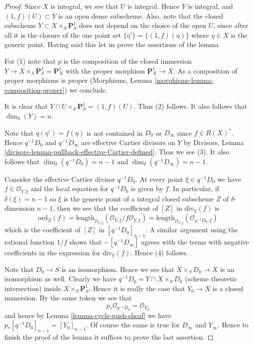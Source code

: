 \begin{proof}
Since $X$ is integral, we see that $U$ is integral.
Hence $Y$ is integral, and $(1, f)(U) \subset Y$ is an open dense subscheme.
Also, note that the closed subscheme $Y \subset X \times_S \mathbf{P}^1_S$
does not depend on the choice of the open $U$, since after all it is
the closure of the one point set $\{\eta'\} = \{(1, f)(\eta)\}$
where $\eta \in X$ is the generic point. Having said this let us
prove the assertions of the lemma.

\medskip\noindent
For (1) note that $p$ is the composition of the closed immersion
$Y \to X \times_S \mathbf{P}^1_S = \mathbf{P}^1_X$ with the proper
morphism $\mathbf{P}^1_X \to X$. As a composition of proper morphisms
is proper (Morphisms, Lemma \ref{morphisms-lemma-composition-proper})
we conclude.

\medskip\noindent
It is clear that $Y \cap U \times_S \mathbf{P}^1_S = (1, f)(U)$.
Thus (2) follows. It also follows that $\dim_\delta(Y) = n$.

\medskip\noindent
Note that $q(\eta') = f(\eta)$ is not contained in $D_0$ or $D_\infty$
since $f \in R(X)^*$. Hence $q^{-1}D_0$ and $q^{-1}D_\infty$ are
effective Cartier divisors on $Y$ by
Divisors, Lemma \ref{divisors-lemma-pullback-effective-Cartier-defined}.
Thus we see (3). It also follows that $\dim_\delta(q^{-1}D_0) = n - 1$
and $\dim_\delta(q^{-1}D_\infty) = n - 1$.

\medskip\noindent
Consider the effective Cartier divisor $q^{-1}D_0$.
At every point $\xi \in q^{-1}D_0$ we have $f \in \mathcal{O}_{Y, \xi}$ and
the local equation for $q^{-1}D_0$ is given by $f$.
In particular, if $\delta(\xi) = n - 1$ so $\xi$ is the generic point
of a integral closed subscheme $Z$ of $\delta$-dimension $n - 1$,
then we see that the coefficient of $[Z]$ in $\text{div}_Y(f)$ is
$$
\text{ord}_Z(f) =
\text{length}_{\mathcal{O}_{Y, \xi}}
(\mathcal{O}_{Y, \xi}/f\mathcal{O}_{Y, \xi}) =
\text{length}_{\mathcal{O}_{Y, \xi}}
(\mathcal{O}_{q^{-1}D_0, \xi})
$$
which is the coefficient of $[Z]$ in $[q^{-1}D_0]_{n - 1}$. A similar
argument using the rational function $1/f$ shows that
$-[q^{-1}D_\infty]$ agrees with the terms with negative coefficients in
the expression for $\text{div}_Y(f)$. Hence (4) follows.

\medskip\noindent
Note that $D_0 \to S$ is an isomorphism. Hence we see that
$X \times_S D_0 \to X$ is an isomorphism as well. Clearly
we have $q^{-1}D_0 = Y \cap X \times_S D_0$ (scheme theoretic intersection)
inside $X \times_S \mathbf{P}^1_S$. Hence it is really the case that
$Y_0 \to X$ is a closed immersion. By the same token we see that
$$
p_*\mathcal{O}_{q^{-1}D_0} = \mathcal{O}_{Y_0}
$$
and hence by Lemma \ref{lemma-cycle-push-sheaf} we
have $p_*[q^{-1}D_0]_{n - 1} = [Y_0]_{n - 1}$. Of course the same
is true for $D_\infty$ and $Y_\infty$. Hence to finish the proof of
the lemma it suffices to prove the last assertion.


\end{proof}

